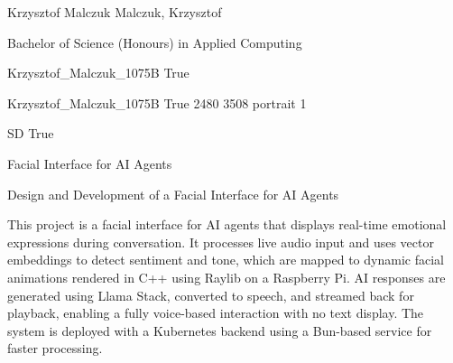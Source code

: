 
\begingroup{}\relax



\def\Key{Krzysztof_Malczuk_1075B}

{Krzysztof Malczuk}
{Malczuk, Krzysztof}

{Bachelor of Science (Honours) in Applied Computing}

{Krzysztof_Malczuk_1075B}
{True}

{Krzysztof_Malczuk_1075B}
{True}
{2480}
{3508}
{portrait}
{1}

{SD}
{True}

{Facial Interface for AI Agents}

{Design and Development of a Facial Interface for AI Agents}

{This project is a facial interface for AI agents that displays real-time emotional expressions during conversation. It processes live audio input and uses vector embeddings to detect sentiment and tone, which are mapped to dynamic facial animations rendered in C++ using Raylib on a Raspberry Pi. AI responses are generated using Llama Stack, converted to speech, and streamed back for playback, enabling a fully voice-based interaction with no text display. The system is deployed with a Kubernetes backend using a Bun-based service for faster processing.}

